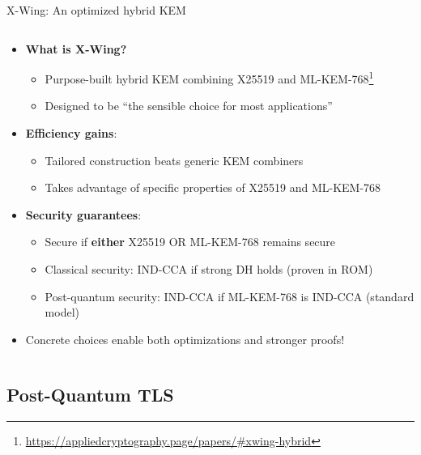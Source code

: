 \documentclass[aspectratio=169, lualatex, handout]{beamer}
\begin{document}
\begin{frame}{X-Wing: An optimized hybrid KEM}
	\begin{columns}[c]
		\begin{column}{1\textwidth}
			\begin{itemize}
				\item \textbf{What is X-Wing?}
				      \begin{itemize}
					      \item Purpose-built hybrid KEM combining X25519 and ML-KEM-768\footnote{\url{https://appliedcryptography.page/papers/\#xwing-hybrid}}
					      \item Designed to be ``the sensible choice for most applications''
				      \end{itemize}
				\item \textbf{Efficiency gains}:
				      \begin{itemize}
					      \item Tailored construction beats generic KEM combiners
					      \item Takes advantage of specific properties of X25519 and ML-KEM-768
				      \end{itemize}
				\item \textbf{Security guarantees}:
				      \begin{itemize}
					      \item Secure if \textbf{either} X25519 OR ML-KEM-768 remains secure
					      \item Classical security: IND-CCA if strong DH holds (proven in ROM)
					      \item Post-quantum security: IND-CCA if ML-KEM-768 is IND-CCA (standard model)
				      \end{itemize}
				\item Concrete choices enable both optimizations and stronger proofs!
			\end{itemize}
		\end{column}
	\end{columns}
\end{frame}

\subsection{Post-Quantum TLS}
\end{document}
